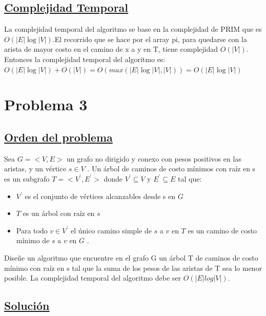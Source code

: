 \documentclass{article}
\begin{document}
    \subsection{\underline{Complejidad Temporal}}
    La complejidad temporal del algoritmo se base en la complejidad de PRIM que es $O(|E|\log{|V|})$.El recorrido 
    que se hace por el array pi, para quedarse con la arista de mayor costo en el camino de x a y en T, tiene complejidad $ O(|V|)$. 
    Entonces la complejidad temporal del algoritmo es:\\ $O(|E|\log{|V|}) + O(|V|) = O(max(|E|\log{|V|}, |V|)) = O(|E|\log{|V|})$

    \newpage 


    \section{Problema 3} 

    \subsection{\underline{Orden del problema}} 

    Sea $G = <V,E>$ un grafo no dirigido y conexo con pesos positivos en las aristas, y un v\'ertice $s \in V$ . Un \'arbol de 
    caminos de costo m\'inimos con ra\'iz en s es un subgrafo $T = <V^{'} , E^{'}> $ donde $V^{'} \subseteq  V $     y $E^{'} \subseteq  E $ tal que: 
    
    \begin{itemize}
        \item $V^{'}$ es el conjunto de v\'ertices alcanzables desde s en $G$
        \item $T$ es un \'arbol con ra\'iz en $s$
        \item Para todo $v \in V^{'}$ el \'unico camino simple de $s$ a $v$ en $T$ es un camino de costo m\'inimo de $s$ a $v$ en $G$ .
    \end{itemize}

    \noindent Dise\~ne un algoritmo que encuentre en el grafo G un \'arbol T de caminos de costo m\'inimo con ra\'iz en s tal que
    la suma de los pesos de las aristas de T sea lo menor posible. La complejidad temporal del algoritmo debe ser
    $O(|E|log|V|)$.


    \subsection{\underline{Soluci\'on }}
\end{document}
